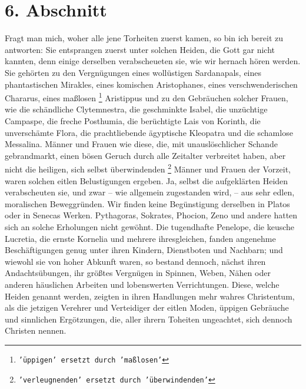\section{6. Abschnitt} \label{kap17_ab6}

Fragt man mich, woher alle jene Torheiten zuerst kamen, so bin ich bereit zu
antworten: Sie entsprangen zuerst unter solchen Heiden, die Gott gar nicht
kannten, denn einige derselben verabscheueten sie, wie wir hernach hören werden.
Sie gehörten zu den Vergnügungen eines wollüstigen
Sardanapals, eines
phantastischen Mirakles, eines komischen
Aristophanes, eines verschwenderischen
Chararus, eines maßlosen
\footnote{\texttt{'üppigen' ersetzt durch 'maßlosen'}}
Aristippus und zu den Gebräuchen solcher Frauen, wie
die
schändliche Clytemnestra, die geschminkte
Isabel, die unzüchtige
Campaspe, die
freche Posthumia, die berüchtigte Lais von
Korinth, die unverschämte Flora, die
prachtliebende ägyptische Kleopatra und die schamlose
Messalina. Männer und
Frauen wie diese, die, mit unauslöschlicher Schande gebrandmarkt, einen bösen
Geruch durch alle Zeitalter verbreitet haben, aber nicht die heiligen, sich
selbst überwindenden
\footnote{\texttt{'verleugnenden' ersetzt durch 'überwindenden'}} Männer und
Frauen der Vorzeit, waren solchen eitlen
Belustigungen ergeben. Ja, selbst die aufgeklärten
Heiden verabscheuten sie,
und zwar -- wie allgemein zugestanden wird, -- aus sehr edlen, moralischen
Beweggründen. Wir finden keine Begünstigung derselben in
Platos oder in
Senecas Werken. Pythagoras,
Sokrates, Phocion,
Zeno und andere hatten sich an
solche Erholungen nicht gewöhnt. Die tugendhafte
Penelope, die keusche
Lucretia, die ernste
Kornelia und mehrere ihresgleichen, fanden angenehme
Beschäftigungen genug unter ihren Kindern, Dienstboten und Nachbarn; und wiewohl
sie von hoher Abkunft waren, so bestand dennoch, nächst ihren Andachtsübungen,
ihr größtes Vergnügen in Spinnen, Weben, Nähen oder anderen häuslichen Arbeiten
und lobenswerten Verrichtungen. Diese, welche Heiden genannt werden, zeigten
in ihren Handlungen mehr wahres Christentum, als die jetzigen Verehrer und
Verteidiger der eitlen Moden, üppigen Gebräuche und sinnlichen Ergötzungen,
die, aller ihrern Toheiten ungeachtet, sich dennoch Christen nennen.


